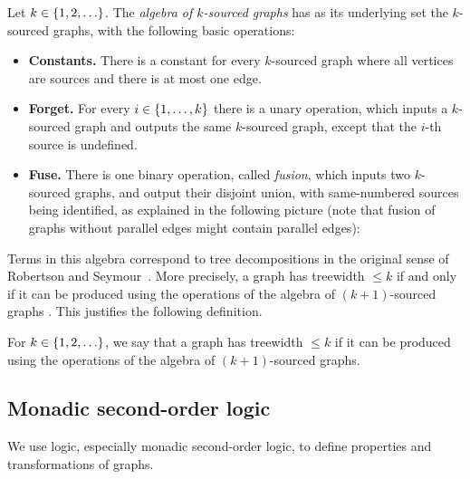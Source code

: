     
    \begin{definition}
         Let $k \in \{1,2,\ldots\}$. The \emph{algebra of $k$-sourced graphs} has as its underlying set the  $k$-sourced graphs,  with the following basic operations:
            \begin{itemize}
                \item {\bf Constants.} There is a constant for every $k$-sourced graph where all vertices are sources and there is at most one edge.
                \item {\bf Forget.} For every $i \in \{1,\ldots,k\}$ there is a unary operation, which inputs a $k$-sourced graph and outputs the same $k$-sourced graph, except that the $i$-th source is undefined. 
                \item {\bf Fuse.} There is one binary operation, called \emph{fusion}, which inputs two $k$-sourced graphs, and output their disjoint union, with same-numbered sources being identified, as explained in the following picture (note that fusion of graphs without parallel edges might contain parallel edges):
            \end{itemize}
        \end{definition}
    
        Terms in this algebra correspond to tree decompositions in the original sense of Robertson and Seymour~\cite[Section 12.3]{diestel}. More precisely, a graph has treewidth $\leq k$  if and only if it can be produced using the operations of the algebra of $(k+1)$-sourced graphs \cite[Proposition 4.1]{courcelleEtAlAlgebraicTheoryOfGraphReduction93}. This justifies the following definition.


  \begin{definition}[Treewidth]
        For $k \in \{1,2,\ldots\}$, we say that a  graph has treewidth  $\le  k$ if it can be produced using the operations of the algebra of $(k+1)$-sourced graphs.
    \end{definition}

  
    

    \subsection{Monadic second-order logic}
    We  use logic, especially monadic second-order logic, to define properties and transformations of graphs. 

